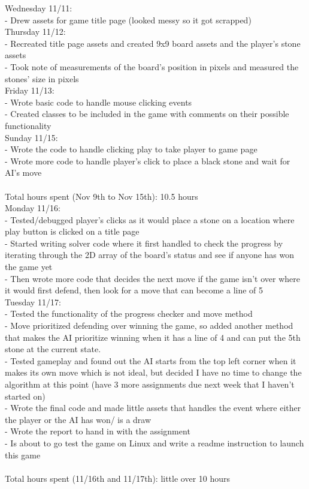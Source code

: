 \documentclass[a4paper]{article}
\begin{document}
Wednesday 11/11:\\
\indent -	Drew assets for game title page (looked messy so it got scrapped)\\
Thursday 11/12:\\
\indent -	Recreated title page assets and created 9x9 board assets and the player’s stone assets\\
\indent -	Took note of measurements of the board’s position in pixels and measured the stones’ size in pixels\\
Friday 11/13:\\
\indent -	Wrote basic code to handle mouse clicking events\\
\indent -	Created classes to be included in the game with comments on their possible functionality\\
Sunday 11/15:\\
\indent -	Wrote the code to handle clicking play to take player to game page\\
\indent -	Wrote more code to handle player’s click to place a black stone and wait for AI’s move\\
\newline\\
Total hours spent (Nov 9th to Nov 15th): 10.5 hours
\newline\\
Monday 11/16:\\
\indent -	Tested/debugged player’s clicks as it would place a stone on a location where play button is clicked on a title page\\
\indent -	Started writing solver code where it first handled to check the progress by iterating through the 2D array of the board’s status and see if anyone has won the game yet\\
\indent -	Then wrote more code that decides the next move if the game isn’t over where it would first defend, then look for a move that can become a line of 5\\
Tuesday 11/17:\\
\indent -	Tested the functionality of the progress checker and move method\\
\indent -	Move prioritized defending over winning the game, so added another method that makes the AI prioritize winning when it has a line of 4 and can put the 5th stone at the current state.\\
\indent -	Tested gameplay and found out the AI starts from the top left corner when it makes its own move which is not ideal, but decided I have no time to change the algorithm at this point (have 3 more assignments due next week that I haven’t started on)\\
\indent -	Wrote the final code and made little assets that handles the event where either the player or the AI has won/ is a draw\\
\indent -	Wrote the report to hand in with the assignment\\
\indent -	Is about to go test the game on Linux and write a readme instruction to launch this game\\
\newline\\
Total hours spent (11/16th and 11/17th): little over 10 hours
\end{document}
